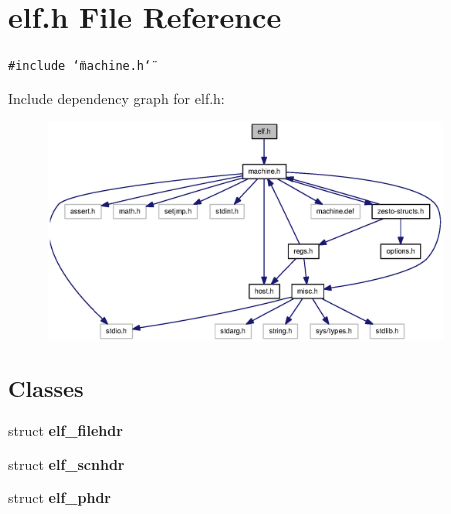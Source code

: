 \section{elf.h File Reference}
\label{elf_8h}
{\tt \#include \char`\"{}machine.h\char`\"{}}\par


Include dependency graph for elf.h:\nopagebreak
\begin{figure}[H]
\begin{center}
\leavevmode
\includegraphics[width=296pt]{elf_8h__incl}
\end{center}
\end{figure}
\subsection*{Classes}
\begin{CompactItemize}
\item 
struct {\bf elf\_\-filehdr}
\item 
struct {\bf elf\_\-scnhdr}
\item 
struct {\bf elf\_\-phdr}
\end{CompactItemize}
